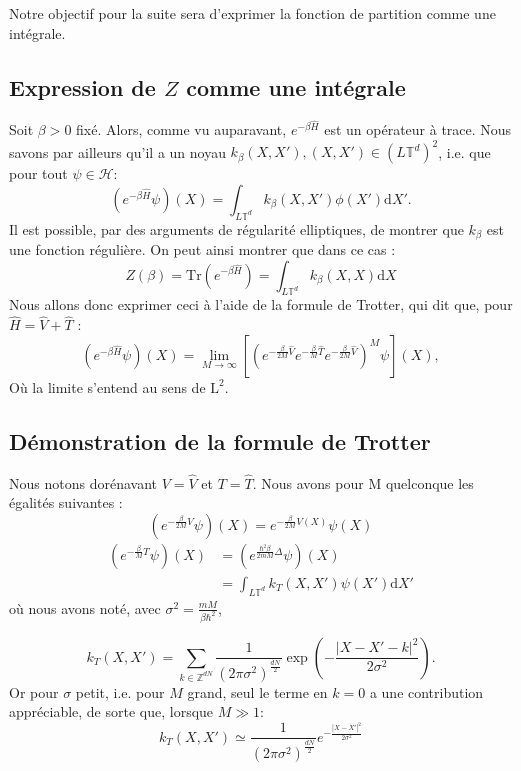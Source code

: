 \documentclass[11pt]{article}
\theoremstyle{definition}
\theoremstyle{remark}
\newcommand{\hham}{\hat{H}}
\newcommand{\dom}{L\mathbb{T}^d}
\begin{document}
Notre objectif pour la suite sera d'exprimer la fonction de partition comme une intégrale.
\subsection{Expression de $Z$ comme une intégrale}
Soit $\beta>0$ fixé. Alors, comme vu auparavant, $e^{-\beta\hham}$ est un opérateur à trace. Nous savons par ailleurs qu'il a un noyau $k_{\beta}(X,X'), (X,X')\in(\dom)^2$, i.e. que pour tout $\psi\in \mathcal{H}$:
\begin{equation}
(e^{-\beta \hham}\psi)(X)=\int_{\dom} k_{\beta}(X,X')\phi(X')\mathrm{d}X'.
\end{equation}
Il est possible, par des arguments de régularité elliptiques, de montrer que $k_\beta$ est une fonction régulière.
On peut ainsi montrer que dans ce cas :
\begin{equation}
Z(\beta)=\mathrm{Tr}(e^{-\beta \hham})=\int_{\dom}k_\beta(X,X)\mathrm{d}X
\end{equation}
Nous allons donc exprimer ceci à l'aide de la formule de Trotter, qui dit que, pour $\hham=\hat{V}+\hat{T}$ :
\begin{equation}
(e^{-\beta \hham}\psi)(X)=\lim_{M\to \infty}\left[(e^{-\frac{\beta}{2M}\hat{V}}e^{-\frac{\beta}{M}\hat{T}}e^{-\frac{\beta}{2M}\hat{V}})^M\psi\right](X),
\end{equation}
Où la limite s'entend au sens de $\mathrm{L}^2$. 

\subsection{Démonstration de la formule de Trotter}
Nous notons dorénavant $V=\hat{V}$ et $T=\hat{T}$.
Nous avons pour M quelconque les égalités suivantes : 
\begin{equation}
(e^{-\frac{\beta}{2M}V}\psi)(X)=e^{-\frac{\beta}{2M}V(X)}\psi(X)
\end{equation}
\begin{align}
(e^{-\frac{\beta}{M}T}\psi)(X)&=(e^{\frac{\hbar^2\beta}{2mM}\Delta}\psi)(X)\\
&=\int_{\dom}k_T(X,X')\psi(X')\mathrm{d}X'
\end{align}
où nous avons noté, avec $\sigma^2=\frac{mM}{\beta \hbar^2}$, 

\begin{equation}
k_T(X,X')=\sum_{k\in\mathbb{Z}^{dN}}\frac{1}{(2\pi\sigma^2)^{\frac{dN}{2}}}\exp\left(-\frac{|X-X'-k|^2}{2\sigma^2}\right).
\end{equation}
Or pour $\sigma$ petit, i.e. pour $M$ grand, seul le terme en $k=0$ a une contribution appréciable, de sorte que, lorsque $M\gg 1$: 
\begin{equation}
k_T(X,X')\simeq\frac{1}{(2\pi\sigma^2)^{\frac{dN}{2}}}e^{-\frac{|X-X'|^2}{2\sigma^2}}
\end{equation}
\end{document}
